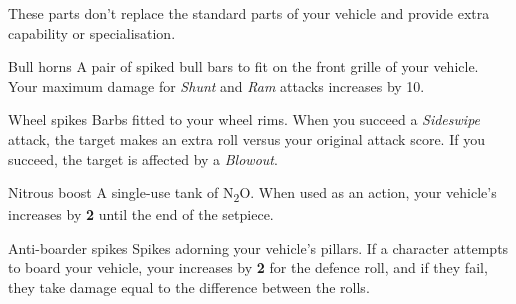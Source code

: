 
These parts don't replace the standard parts of your vehicle and provide extra capability or specialisation.

\begin{describe}{Bull horns}
  A pair of spiked bull bars to fit on the front grille of your vehicle. Your maximum damage for \emph{Shunt} and \emph{Ram} attacks increases by 10.
\end{describe}

\begin{describe}{Wheel spikes}
  Barbs fitted to your wheel rims. When you succeed a \emph{Sideswipe} attack, the target makes an extra  roll versus your original attack score. If you succeed, the target is affected by a \emph{Blowout}.
\end{describe}

\begin{describe}{Nitrous boost}
  A single-use tank of N\textsubscript{2}O. When used as an action, your vehicle's  increases by \textbf{2} until the end of the setpiece.
\end{describe}

\begin{describe}{Anti-boarder spikes}
  Spikes adorning your vehicle's pillars. If a character attempts to board your vehicle, your  increases by \textbf{2} for the defence roll, and if they fail, they take damage equal to the difference between the rolls.
\end{describe}
